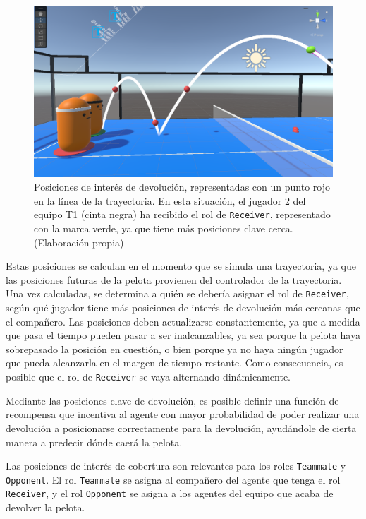 \begin{figure}[H]
    \centering
    \includegraphics[width=13cm]{figures/receiver-keypoints.png}
    \caption[Posiciones de interés de devolución]{Posiciones de interés de devolución, representadas con un punto rojo en la línea de la trayectoria. En esta situación, el jugador 2 del equipo T1 (cinta negra) ha recibido el rol de \texttt{Receiver}, representado con la marca verde, ya que tiene más posiciones clave cerca. (Elaboración propia)}
    \label{fig:receiver-keypoints}
\end{figure}

Estas posiciones se calculan en el momento que se simula una trayectoria, ya que las posiciones futuras de la pelota provienen del controlador de la trayectoria. Una vez calculadas, se determina a quién se debería asignar el rol de \texttt{Receiver}, según qué jugador tiene más posiciones de interés de devolución más cercanas que el compañero. Las posiciones deben actualizarse constantemente, ya que a medida que pasa el tiempo pueden pasar a ser inalcanzables, ya sea porque la pelota haya sobrepasado la posición en cuestión, o bien porque ya no haya ningún jugador que pueda alcanzarla en el margen de tiempo restante. Como consecuencia, es posible que el rol de \texttt{Receiver} se vaya alternando dinámicamente.

Mediante las posiciones clave de devolución, es posible definir una función de recompensa que incentiva al agente con mayor probabilidad de poder realizar una devolución a posicionarse correctamente para la devolución, ayudándole de cierta manera a predecir dónde caerá la pelota.

Las posiciones de interés de cobertura son relevantes para los roles \texttt{Teammate} y \texttt{Opponent}. El rol \texttt{Teammate} se asigna al compañero del agente que tenga el rol \texttt{Receiver}, y el rol \texttt{Opponent} se asigna a los agentes del equipo que acaba de devolver la pelota.

